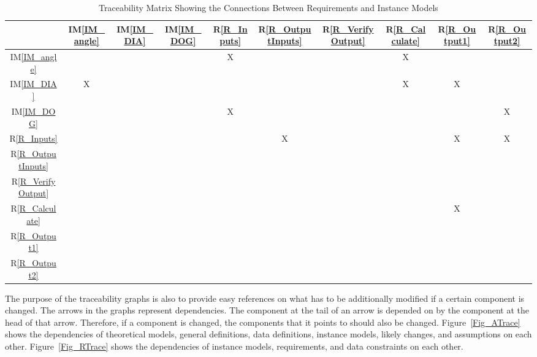 \documentclass[12pt]{article}
\newcommand{\iref}[1]{IM\ref{#1}}
\newcommand{\rref}[1]{R\ref{#1}}
\begin{document}
\begin{table}[h!]
\centering
\begin{tabular}{|c|c|c|c|c|c|c|c|c|c|}
\hline
	& \iref{IM_angle}& \iref{IM_DIA}& \iref{IM_DOG}& \rref{R_Inputs}& \rref{R_OutputInputs}& \rref{R_VerifyOutput}& \rref{R_Calculate}& \rref{R_Output1}& \rref{R_Output2} \\
\hline
\iref{IM_angle}            & & & & X& & & X& &\\ \hline
\iref{IM_DIA}            & X& & & & & & X& X&\\ \hline
\iref{IM_DOG}          & & & & X& & & & &X\\ \hline
\rref{R_Inputs}          & & & & & X& & & X&X\\ \hline
\rref{R_OutputInputs}     & & & & & & & & &\\ \hline
\rref{R_VerifyOutput}    & & & & & & & & &\\ \hline
\rref{R_Calculate}   & & & & & & & & X&\\ \hline
\rref{R_Output1}  & & & & & & & & &\\ \hline
\rref{R_Output2}  & & & & & & & & &\\ \hline
\end{tabular}
\caption{Traceability Matrix Showing the Connections Between Requirements and Instance Models}
\label{Table:R_trace}
\end{table}

The purpose of the traceability graphs is also to provide easy references on
what has to be additionally modified if a certain component is changed.  The
arrows in the graphs represent dependencies. The component at the tail of an
arrow is depended on by the component at the head of that arrow. Therefore, if a
component is changed, the components that it points to should also be
changed. Figure~\ref{Fig_ATrace} shows the dependencies of theoretical models,
general definitions, data definitions, instance models, likely changes, and
assumptions on each other. Figure~\ref{Fig_RTrace} shows the dependencies of
instance models, requirements, and data constraints on each other.

\end{document}
